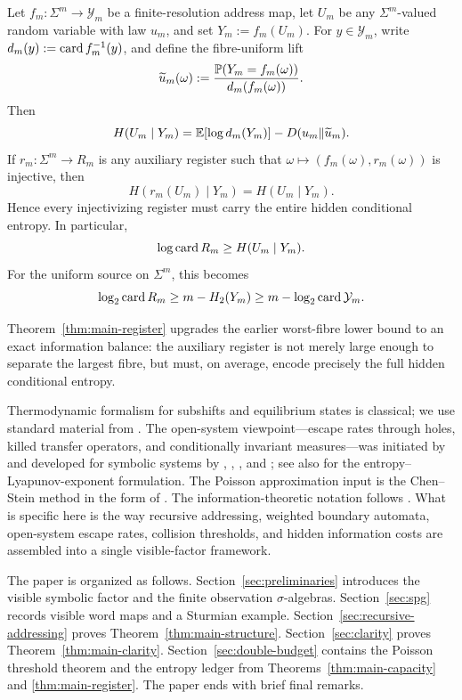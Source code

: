 \begin{theorem}
\label{thm:main-register}
Let \(f_m:\Sigma^m\to \mathcal{Y}_m\) be a finite-resolution address map, let
\(U_m\) be any \(\Sigma^m\)-valued random variable with law \(u_m\), and
set \(Y_m:=f_m(U_m)\).  For \(y\in \mathcal{Y}_m\), write
\(d_m(y):=\operatorname{card}{f_m^{-1}(y)}\), and define the fibre-uniform lift
\[
  \widetilde u_m(\omega)
  := \frac{\mathbb{P}(Y_m=f_m(\omega))}
           {d_m(f_m(\omega))}.
\]
Then
\[
  H(U_m\mid Y_m)
  = \mathbb{E}[\log d_m(Y_m)] - D(u_m\Vert \widetilde u_m).
\]
If \(r_m:\Sigma^m\to R_m\) is any auxiliary register such that
\(\omega\mapsto(f_m(\omega),r_m(\omega))\) is injective, then
\[
  H(r_m(U_m)\mid Y_m)=H(U_m\mid Y_m).
\]
Hence every injectivizing register must carry the entire hidden
conditional entropy.  In particular,
\[
  \log\operatorname{card}{R_m}\geq H(U_m\mid Y_m).
\]
For the uniform source on \(\Sigma^m\), this becomes
\[
  \log_2\operatorname{card}{R_m}
  \geq m-H_2(Y_m)\geq m-\log_2\operatorname{card}{\mathcal{Y}_m}.
\]
\end{theorem}

Theorem~\ref{thm:main-register} upgrades the earlier worst-fibre lower
bound to an exact information balance: the auxiliary register is not
merely large enough to separate the largest fibre, but must, on
average, encode precisely the full hidden conditional entropy.

Thermodynamic formalism for subshifts and equilibrium states is
classical; we use standard material from
\citet{Bowen2008,Ruelle1978,Walters1975GMeasures,WaltersErgodicTheory}.
The open-system viewpoint---escape rates through holes, killed transfer
operators, and conditionally invariant measures---was initiated by
\citet{PianigianiYorke1979} and developed for symbolic systems by
\citet{ColletMartinezSchmitt1997}, \citet{DemersYoung2006},
\citet{KellerLiverani2009}, and \citet{FergusonPollicott2012}; see
also \citet{DemersWrightYoung2012} for the entropy--Lyapunov-exponent
formulation.
The Poisson approximation input is the Chen--Stein method in the form
of \citet{ArratiaGoldsteinGordon1989}.  The information-theoretic
notation follows \citet{CoverThomas2006}.  What is specific here is the
way recursive addressing, weighted boundary automata, open-system escape
rates, collision thresholds, and hidden information costs are assembled
into a single visible-factor framework.

The paper is organized as follows.  Section~\ref{sec:preliminaries}
introduces the visible symbolic factor and the finite observation
\(\sigma\)-algebras.  Section~\ref{sec:spg} records visible word maps
and a Sturmian example.  Section~\ref{sec:recursive-addressing} proves
Theorem~\ref{thm:main-structure}.  Section~\ref{sec:clarity} proves
Theorem~\ref{thm:main-clarity}.  Section~\ref{sec:double-budget}
contains the Poisson threshold theorem and the entropy ledger from
Theorems~\ref{thm:main-capacity} and \ref{thm:main-register}.  The
paper ends with brief final remarks.
